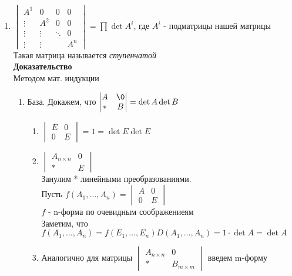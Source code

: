 \documentclass[12pt]{article}
\begin{document}
\begin{enumerate}
    \item $\begin{vmatrix}
    A^1 & 0 & 0 & 0\\
    \vdots & A^2 & 0 & 0\\
    \vdots & \vdots & \ddots & 0\\
    \vdots & \vdots & &  A^n
    \end{vmatrix} = \prod \det A^i$, где $A^i$ - подматрицы нашей матрицы\\
    Такая матрица называется \textit{ступенчатой}\\
    \textbf{Доказательство}\\
    Методом мат. индукции
    \begin{enumerate}
        \item База. Докажем, что $\begin{vmatrix}
            A & \0\\
            * & B
        \end{vmatrix} = \det A \det B$
        \begin{enumerate}
            \item $\begin{vmatrix}
                E & 0\\
                0 & E
            \end{vmatrix} = 1 = \det E \det E$
            \item $\begin{vmatrix}
                A_{n\times n} & 0\\
                * & E
            \end{vmatrix}$\\
            Занулим * линейными преобразованиями.\\
            Пусть $f(A_1,\ldots, A_n) = \begin{vmatrix}
                A & 0\\
                0 & E
            \end{vmatrix}$\\
            $f$ - n-форма по очевидным соображениеям\\
            Заметим, что $f(A_1, \ldots, A_n) = f(E_1, \ldots, E_n) D(A_1, \ldots, A_n) = 1\cdot \det A = \det A$
            \item Аналогично для матрицы $\begin{vmatrix}
                A_{n\times n} & 0\\
                * & B_{m\times m}
            \end{vmatrix}$ введем m-форму\\

\end{enumerate}
\end{enumerate}
\end{enumerate}
\end{document}
